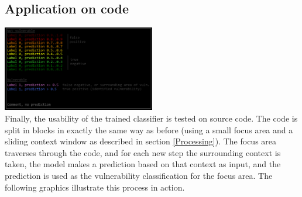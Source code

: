 \documentclass[
	a4paper,
	pagesize,
	pdftex,
	12pt,
	twoside, %
	BCOR=5mm, %
	ngerman,
	fleqn,
	final,
	]{scrartcl}
\begin{document}
\subsection{Application on code}
\includegraphics[width=0.5\textwidth]{img/Legende}\\
Finally, the usability of the trained classifier is tested on source code. The code is split in blocks in exactly the same way as before (using a small focus area and a sliding context window as described in section \ref{Processing}). The focus area traverses through the code, and for each new step the surrounding context is taken, the model makes a prediction based on that context as input, and the prediction is used as the vulnerability classification for the focus area. The following graphics illustrate this process in action. \\
\end{document}
